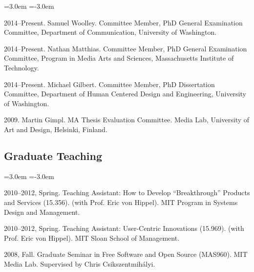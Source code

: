 \documentclass[10pt]{article}
\newenvironment{cvlist}{
\begin{list}{}{\leftmargin=3.0em \itemindent=-3.0em}
  \setlength{\itemsep}{0pt}
  \setlength{\parskip}{0em}
  \setlength{\parsep}{1em}
  \setlength{\parindent}{0em}}
{\vspace{1em}
\end{list}}
\begin{document}
\begin{cvlist}
\item 2014--Present. Samuel Woolley. Committee Member, PhD General Examination Committee, Department of Communication, University of Washington.
\item 2014--Present. Nathan Matthias. Committee Member, PhD General Examination Committee, Program in Media Arts and Sciences, Massachusetts Institute of Technology.
\item 2014--Present. Michael Gilbert. Committee Member, PhD Dissertation Committee, Department of Human Centered Design and Engineering, University of Washington.
\item 2009. Martin Gimpl. MA Thesis Evaluation Committee. Media Lab, University of Art and Design, Helsinki, Finland.
\end{cvlist}

\subsection{Graduate Teaching}
\begin{cvlist}
\item 2010--2012, Spring. Teaching Assistant: How to Develop ``Breakthrough'' Products and Services (15.356). (with Prof. Eric von Hippel). MIT Program in Systems Design and Management.
\item 2010--2012, Spring. Teaching Assistant: User-Centric Innovations (15.969). (with Prof. Eric von Hippel). MIT Sloan School of Management.
\item 2008, Fall. Graduate Seminar in Free Software and Open Source (MAS960). MIT Media Lab. Supervised by Chris Csikszentmihályi.
\end{cvlist}



\end{document}
